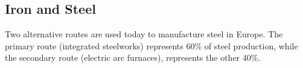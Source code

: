 






\subsection{Iron and Steel}
\label{sec:si:industry:steel}

Two alternative routes are used today to manufacture steel in Europe. The
primary route (integrated steelworks) represents 60\% of steel production, while
the secondary route (electric arc furnaces), represents the other 40\%.

